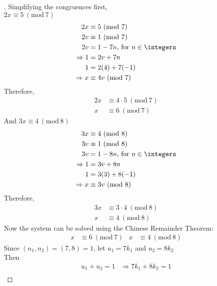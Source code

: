 \documentclass[paper=usletter, fontsize=12pt]{article}
\newcommand{\Mod}[1]{\ (\mathrm{mod}\ #1)}
\begin{document}
\begin{itemize}
\begin{itemize}
\begin{proof}[\unskip\nopunct]
                Simplifying the congruences first,\\
                $2x \equiv 5 \Mod{7}$
                \begin{align*}
                    2x & \equiv 5 \Mod{7} \\
                    2v & \equiv 1 \Mod{7} \\
                    2v & = 1 - 7n \text{, for } n \in \integers\\
                    \Rightarrow 1 & = 2v + 7n\\
                    1 & = 2(4) + 7(-1)\\
                    \Rightarrow x & \equiv 4v \Mod{7}
                \end{align*}
                Therefore,
                \begin{align*}
                    2x & \equiv 4 \cdot 5 \Mod{7}\\
                    x & \equiv 6 \Mod{7}
                \end{align*}
                And $3x \equiv 4 \Mod{8}$
                \begin{align*}
                    3x & \equiv 4 \Mod{8} \\
                    3v & \equiv 1 \Mod{8} \\
                    3v & = 1 - 8n \text{, for } n \in \integers\\
                    \Rightarrow 1 & = 3v + 8n\\
                    1 & = 3(3) + 8(-1)\\
                    \Rightarrow x & \equiv 3v \Mod{8}
                \end{align*}
                Therefore,
                \begin{align*}
                    3x & \equiv 3 \cdot 4 \Mod{8}\\
                    x & \equiv 4 \Mod{8}
                \end{align*}
                Now the system can be solved using the Chinese Remainder Theorem:
                \begin{align*}
                    x & \equiv 6 \Mod{7} & x & \equiv 4 \Mod{8}
                \end{align*}
                Since $(n_1,n_2)=(7,8)=1$, let $u_1 = 7k_1$ and $u_2 = 8k_2$\\
                Then
                \begin{align*}
                    u_1+u_2=1 & \Rightarrow 7k_1 + 8k_2=1\\

\end{align*}
\end{proof}
\end{itemize}
\end{itemize}
\end{document}
